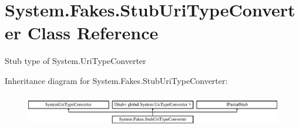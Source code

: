 \hypertarget{class_system_1_1_fakes_1_1_stub_uri_type_converter}{\section{System.\-Fakes.\-Stub\-Uri\-Type\-Converter Class Reference}
\label{class_system_1_1_fakes_1_1_stub_uri_type_converter}
}


Stub type of System.\-Uri\-Type\-Converter 


Inheritance diagram for System.\-Fakes.\-Stub\-Uri\-Type\-Converter\-:\begin{figure}[H]
\begin{center}
\leavevmode
\includegraphics[height=1.464052cm]{class_system_1_1_fakes_1_1_stub_uri_type_converter}
\end{center}
\end{figure}
